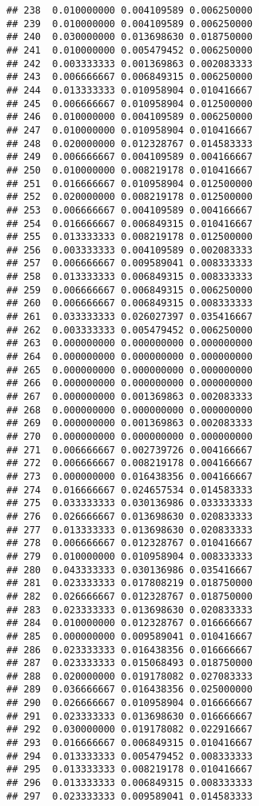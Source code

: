 \documentclass[
]{article}
\begin{document}
\begin{verbatim}
## 238  0.010000000 0.004109589 0.006250000
## 239  0.010000000 0.004109589 0.006250000
## 240  0.030000000 0.013698630 0.018750000
## 241  0.010000000 0.005479452 0.006250000
## 242  0.003333333 0.001369863 0.002083333
## 243  0.006666667 0.006849315 0.006250000
## 244  0.013333333 0.010958904 0.010416667
## 245  0.006666667 0.010958904 0.012500000
## 246  0.010000000 0.004109589 0.006250000
## 247  0.010000000 0.010958904 0.010416667
## 248  0.020000000 0.012328767 0.014583333
## 249  0.006666667 0.004109589 0.004166667
## 250  0.010000000 0.008219178 0.010416667
## 251  0.016666667 0.010958904 0.012500000
## 252  0.020000000 0.008219178 0.012500000
## 253  0.006666667 0.004109589 0.004166667
## 254  0.016666667 0.006849315 0.010416667
## 255  0.013333333 0.008219178 0.012500000
## 256  0.003333333 0.004109589 0.002083333
## 257  0.006666667 0.009589041 0.008333333
## 258  0.013333333 0.006849315 0.008333333
## 259  0.006666667 0.006849315 0.006250000
## 260  0.006666667 0.006849315 0.008333333
## 261  0.033333333 0.026027397 0.035416667
## 262  0.003333333 0.005479452 0.006250000
## 263  0.000000000 0.000000000 0.000000000
## 264  0.000000000 0.000000000 0.000000000
## 265  0.000000000 0.000000000 0.000000000
## 266  0.000000000 0.000000000 0.000000000
## 267  0.000000000 0.001369863 0.002083333
## 268  0.000000000 0.000000000 0.000000000
## 269  0.000000000 0.001369863 0.002083333
## 270  0.000000000 0.000000000 0.000000000
## 271  0.006666667 0.002739726 0.004166667
## 272  0.006666667 0.008219178 0.004166667
## 273  0.000000000 0.016438356 0.004166667
## 274  0.016666667 0.024657534 0.014583333
## 275  0.033333333 0.030136986 0.033333333
## 276  0.026666667 0.013698630 0.020833333
## 277  0.013333333 0.013698630 0.020833333
## 278  0.006666667 0.012328767 0.010416667
## 279  0.010000000 0.010958904 0.008333333
## 280  0.043333333 0.030136986 0.035416667
## 281  0.023333333 0.017808219 0.018750000
## 282  0.026666667 0.012328767 0.018750000
## 283  0.023333333 0.013698630 0.020833333
## 284  0.010000000 0.012328767 0.016666667
## 285  0.000000000 0.009589041 0.010416667
## 286  0.023333333 0.016438356 0.016666667
## 287  0.023333333 0.015068493 0.018750000
## 288  0.020000000 0.019178082 0.027083333
## 289  0.036666667 0.016438356 0.025000000
## 290  0.026666667 0.010958904 0.016666667
## 291  0.023333333 0.013698630 0.016666667
## 292  0.030000000 0.019178082 0.022916667
## 293  0.016666667 0.006849315 0.010416667
## 294  0.013333333 0.005479452 0.008333333
## 295  0.013333333 0.008219178 0.010416667
## 296  0.013333333 0.006849315 0.008333333
## 297  0.023333333 0.009589041 0.014583333

\end{verbatim}
\end{document}
